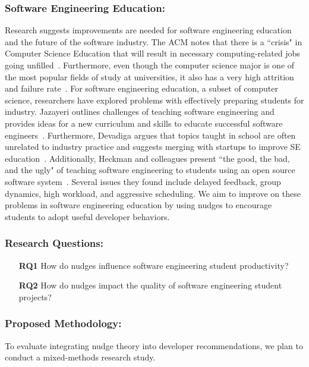 \subsubsection{Software Engineering Education:} Research suggests improvements are needed for software engineering education and the future of the software industry. The ACM notes that there is a ``crisis" in Computer Science Education that will result in necessary computing-related jobs going unfilled~\cite{emptyfailure}. Furthermore, even though the computer science major is one of the most popular fields of study at universities, it also has a very high attrition and failure rate~\cite{beaubouef2005high}. For software engineering education, a subset of computer science, researchers have explored problems with effectively preparing students for industry. Jazayeri outlines challenges of teaching software engineering and provides ideas for a new curriculum and skills to educate successful software engineers~\cite{jazayeri2004education}. Furthermore, Devadiga argues that topics taught in school are often unrelated to industry practice and suggests merging with startups to improve SE education~\cite{devadiga2017software}. Additionally, Heckman and colleagues present ``the good, the bad, and the ugly" of teaching software engineering to students using an open source software system~\cite{Heckman2018Itrust}. Several issues they found include delayed feedback, group dynamics, high workload, and aggressive scheduling. We aim to improve on these problems in software engineering education by using nudges to encourage students to adopt useful developer behaviors.

\subsubsection{Research Questions:}

\begin{itemize}
    \item[\textbf{RQ1}] How do nudges influence software engineering student productivity?
    \item[\textbf{RQ2}] How do nudges impact the quality of software engineering student projects?
\end{itemize}

\subsubsection{Proposed Methodology:}

To evaluate integrating nudge theory into developer recommendations, we plan to conduct a mixed-methods research study.

